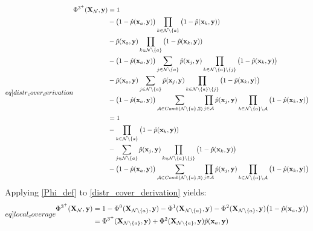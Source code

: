 \begin{equation}\label[eq]{distr_cover_derivation}
  \begin{split}
    \Phi^{3^{+}}(\mathbf{X}_{\mathcal{N}}, \mathbf{y}) &= 1\\
    &- \big(1-\hat{p}(\mathbf{x}_{a}, \mathbf{y})\big)\prod_{k\in\mathcal{N}\setminus\{a\}}\big(1-\hat{p}(\mathbf{x}_{k}, \mathbf{y}))\\
    &- \hat{p}(\mathbf{x}_{a}, \mathbf{y})\prod_{k\in\mathcal{N}\setminus\{a\}}\big(1-\hat{p}(\mathbf{x}_{k}, \mathbf{y}))\\
    &- \big(1-\hat{p}(\mathbf{x}_{a}, \mathbf{y})\big)\sum_{j\in\mathcal{N}\setminus\{a\}}\hat{p}(\mathbf{x}_{j}, \mathbf{y})\prod_{k\in\mathcal{N}\setminus\{a\}\setminus\{j\}}\big(1-\hat{p}(\mathbf{x}_{k}, \mathbf{y})\big)\\
    &- \hat{p}(\mathbf{x}_{a}, \mathbf{y})\sum_{j\in \mathcal{N}\setminus\{a\}}\hat{p}(\mathbf{x}_{j}, \mathbf{y})\prod_{k\in\mathcal{N}\setminus\{a\}\setminus\{j\}}\big(1-\hat{p}(\mathbf{x}_{k}, \mathbf{y})\big)\\
    &- \big(1-\hat{p}(\mathbf{x}_{a}, \mathbf{y})\big)\sum_{\mathcal{A}\in Comb(\mathcal{N}\setminus\{a\}, 2)}\prod_{j\in\mathcal{A}}\hat{p}(\mathbf{x}_{j}, \mathbf{y})\prod_{k\in\mathcal{N}\setminus\{a\}\setminus\mathcal{A}}\big(1-\hat{p}(\mathbf{x}_{k}, \mathbf{y})\big)\\
    &= 1\\
    &- \prod_{k\in\mathcal{N}\setminus\{a\}}\big(1-\hat{p}(\mathbf{x}_{k}, \mathbf{y}))\\
    &- \sum_{j\in\mathcal{N}\setminus\{a\}}\hat{p}(\mathbf{x}_{j}, \mathbf{y})\prod_{k\in\mathcal{N}\setminus\{a\}\setminus\{j\}}\big(1-\hat{p}(\mathbf{x}_{k}, \mathbf{y})\big)\\
    &- \big(1-\hat{p}(\mathbf{x}_{a}, \mathbf{y})\big)\sum_{\mathcal{A}\in Comb(\mathcal{N}\setminus\{a\}, 2)}\prod_{j\in\mathcal{A}}\hat{p}(\mathbf{x}_{j}, \mathbf{y})\prod_{k\in\mathcal{N}\setminus\{a\}\setminus\mathcal{A}}\big(1-\hat{p}(\mathbf{x}_{k}, \mathbf{y})\big)\\
  \end{split}
\end{equation}
Applying \eqref{Phi_def} to \eqref{distr_cover_derivation} yields:
\begin{equation}\label[eq]{local_coverage}
  \begin{split}
    \Phi^{3^{+}}(\mathbf{X}_{\mathcal{N}}, \mathbf{y}) &= 1 - \Phi^{0}(\mathbf{X}_{\mathcal{N}\setminus\{a\}}, \mathbf{y}) - \Phi^{1}(\mathbf{X}_{\mathcal{N}\setminus\{a\}}, \mathbf{y}) - \Phi^{2}(\mathbf{X}_{\mathcal{N}\setminus\{a\}}, \mathbf{y})\big(1-\hat{p}(\mathbf{x}_{a}, \mathbf{y})\big)\\
    &= \Phi^{3^{+}}(\mathbf{X}_{\mathcal{N}\setminus\{a\}}, \mathbf{y}) + \Phi^{2}(\mathbf{X}_{\mathcal{N}\setminus\{a\}}, \mathbf{y})\hat{p}(\mathbf{x}_{a}, \mathbf{y})\\
  \end{split}
\end{equation}
